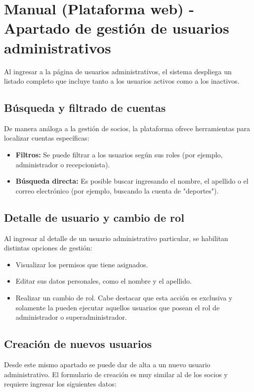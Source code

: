 \section{Manual (Plataforma web) - Apartado de gestión de usuarios administrativos}

Al ingresar a la página de usuarios administrativos, el sistema despliega un listado completo que incluye tanto a los usuarios activos como a los inactivos.

\subsection{Búsqueda y filtrado de cuentas}
De manera análoga a la gestión de socios, la plataforma ofrece herramientas para localizar cuentas específicas:

\begin{itemize}
    \item \textbf{Filtros:} Se puede filtrar a los usuarios según sus roles (por ejemplo, administrador o recepcionista).
    \item \textbf{Búsqueda directa:} Es posible buscar ingresando el nombre, el apellido o el correo electrónico (por ejemplo, buscando la cuenta de "deportes").
\end{itemize}

\subsection{Detalle de usuario y cambio de rol}
Al ingresar al detalle de un usuario administrativo particular, se habilitan distintas opciones de gestión:

\begin{itemize}
    \item Visualizar los permisos que tiene asignados.
    \item Editar sus datos personales, como el nombre y el apellido.
    \item Realizar un cambio de rol. Cabe destacar que esta acción es exclusiva y solamente la pueden ejecutar aquellos usuarios que posean el rol de administrador o superadministrador.
\end{itemize}

\subsection{Creación de nuevos usuarios}
Desde este mismo apartado se puede dar de alta a un nuevo usuario administrativo. El formulario de creación es muy similar al de los socios y requiere ingresar los siguientes datos:

